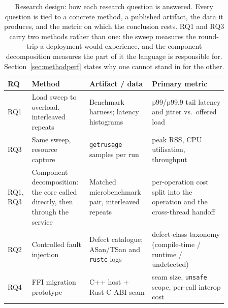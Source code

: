 \documentclass[english,twoside,openright,a4paper,censored,csm,software-track-2020]{HYthesisML}
\begin{document}
\begin{table}
\centering
\caption[Research design: how each research question is answered]{Research design: how each research question is answered. Every question is tied to a
concrete method, a published artifact, the data it produces, and the metric on which the
conclusion rests. RQ1 and RQ3 carry two methods rather than one: the sweep measures the
round-trip a deployment would experience, and the component decomposition measures the part of
it the language is responsible for. Section~\ref{sec:methodperf} states why one cannot stand in
for the other.\label{tab:design}}
\renewcommand{\arraystretch}{1.25}
\begin{tabular}{@{}p{0.06\linewidth} p{0.24\linewidth} p{0.24\linewidth} p{0.32\linewidth}@{}}
\hline\hline
RQ & Method & Artifact / data & Primary metric \\
\hline
RQ1 & Load sweep to overload, interleaved repeats & Benchmark harness; latency histograms &
p99/p99.9 tail latency and jitter vs.\ offered load \\
RQ3 & Same sweep, resource capture & \texttt{getrusage} samples per run &
peak RSS, CPU utilisation, throughput \\
RQ1, RQ3 & Component decomposition: the core called directly, then through the service &
Matched microbenchmark pair, interleaved repeats &
per-operation cost split into the operation and the cross-thread handoff \\
RQ2 & Controlled fault injection & Defect catalogue; ASan/TSan and \texttt{rustc} logs &
defect-class taxonomy (compile-time / runtime / undetected) \\
RQ4 & FFI migration prototype & C++ host $+$ Rust C-ABI seam &
seam size, \texttt{unsafe} scope, per-call interop cost \\
\hline
\end{tabular}
\end{table}
\end{document}
